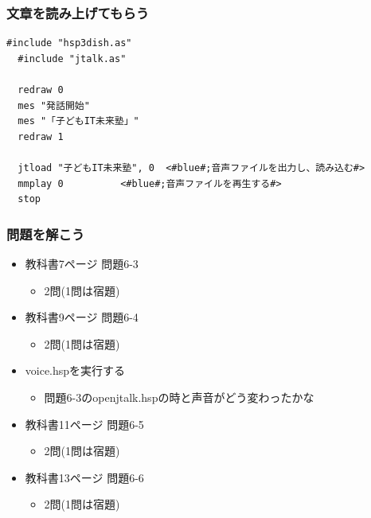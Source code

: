 \documentclass[14pt]{beamer}
\begin{document}
\begin{frame}[fragile]
  \frametitle{文章を読み上げてもらう}
  
  \begin{lstlisting}[title=openjtalk.hsp,label=openjtalk.hsp]
  #include "hsp3dish.as"
  #include "jtalk.as"

  redraw 0
  mes "発話開始"
  mes "「子どもIT未来塾」"
  redraw 1

  jtload "子どもIT未来塾", 0	<#blue#;音声ファイルを出力し、読み込む#>
  mmplay 0			<#blue#;音声ファイルを再生する#>
  stop
  \end{lstlisting}
\end{frame}

\begin{frame}
  \frametitle{問題を解こう}
  \begin{itemize}
    \item 教科書7ページ 問題6-3
    \begin{itemize}
      \item 2問(1問は宿題)
    \end{itemize}
  \end{itemize}
\end{frame}

\begin{frame}
  \begin{itemize}
    \item 教科書9ページ 問題6-4
    \begin{itemize}
      \item 2問(1問は宿題)
    \end{itemize}
    \item voice.hspを実行する\\
    \begin{itemize}
    \item 問題6-3のopenjtalk.hspの時と声音がどう変わったかな\\
    \end{itemize}
  \end{itemize}
\end{frame}

\begin{frame}
  \begin{itemize}
    \item 教科書11ページ 問題6-5
    \begin{itemize}
      \item 2問(1問は宿題)
    \end{itemize}
    \item 教科書13ページ 問題6-6
    \begin{itemize}
      \item 2問(1問は宿題)
    \end{itemize}
  \end{itemize}
  
\end{frame}
\end{document}

